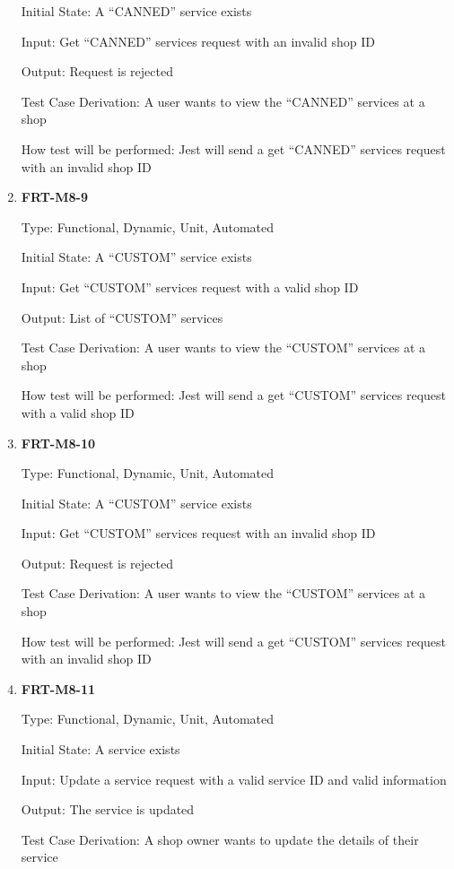 \documentclass[12pt, titlepage]{article}
\begin{document}
\begin{enumerate}
	      Initial State: A ``CANNED'' service exists

	      Input: Get ``CANNED'' services request with an invalid shop ID

	      Output: Request is rejected

	      Test Case Derivation: A user wants to view the ``CANNED'' services at a shop

	      How test will be performed: Jest will send a get ``CANNED'' services request with an invalid shop
	      ID

	\item \textbf{FRT-M8-9}

	      Type: Functional, Dynamic, Unit, Automated

	      Initial State: A ``CUSTOM'' service exists

	      Input: Get ``CUSTOM'' services request with a valid shop ID

	      Output: List of ``CUSTOM'' services

	      Test Case Derivation: A user wants to view the ``CUSTOM'' services at a shop

	      How test will be performed: Jest will send a get ``CUSTOM'' services request with a valid shop ID

	\item \textbf{FRT-M8-10}

	      Type: Functional, Dynamic, Unit, Automated

	      Initial State: A ``CUSTOM'' service exists

	      Input: Get ``CUSTOM'' services request with an invalid shop ID

	      Output: Request is rejected

	      Test Case Derivation: A user wants to view the ``CUSTOM'' services at a shop

	      How test will be performed: Jest will send a get ``CUSTOM'' services request with an invalid shop
	      ID

	\item \textbf{FRT-M8-11}

	      Type: Functional, Dynamic, Unit, Automated

	      Initial State: A service exists

	      Input: Update a service request with a valid service ID and valid information

	      Output: The service is updated

	      Test Case Derivation: A shop owner wants to update the details of their service


\end{enumerate}
\end{document}
